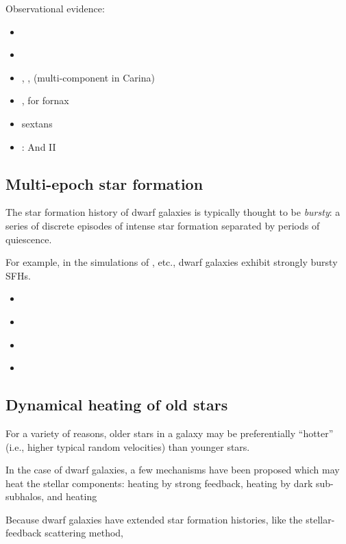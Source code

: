 Observational evidence:

\begin{itemize}
\tightlist
\item
  \citet{arroyo-polonio+2024}
\item
  \citet{pace+2020}
\item
  \citet{battaglia+2012}, \citet{fabrizio+2016}, \citet{kordopatis+2016}
  (multi-component in Carina)
\item
  \citet{battaglia+2006}, \citet{amorisco+evans2012} for fornax
\item
  \citet{battaglia+2011} sextans
\item
  \citet{ho+2012}: And II
\end{itemize}

\subsection{Multi-epoch star
formation}\label{multi-epoch-star-formation}

The star formation history of dwarf galaxies is typically thought to be
\emph{bursty}: a series of discrete episodes of intense star formation
separated by periods of quiescence.

For example, in the simulations of \citet{wheeler+2019}, etc., dwarf
galaxies exhibit strongly bursty SFHs.

\begin{itemize}
\item
  \citet{maxwell+2012}
\item
  \citet{wright+2019}
\item
  \citet{azartash-namin+2024}
\item
  \citet{dong+lin+murray2003}
\end{itemize}

\subsection{Dynamical heating of old
stars}\label{dynamical-heating-of-old-stars}

For a variety of reasons, older stars in a galaxy may be preferentially
``hotter'' (i.e., higher typical random velocities) than younger stars.

In the case of dwarf galaxies, a few mechanisms have been proposed which
may heat the stellar components: heating by strong feedback, heating by
dark sub-subhalos, and heating

Because dwarf galaxies have extended star formation histories, like the
stellar-feedback scattering method,

